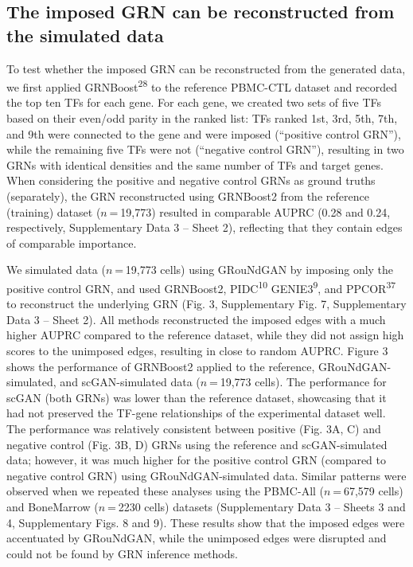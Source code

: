 \subsection*{The imposed GRN can be reconstructed from the simulated data}

To test whether the imposed GRN can be reconstructed from the generated data, we first applied GRNBoost\textsuperscript{28} to the reference PBMC-CTL dataset and recorded the top ten TFs for each gene. For each gene, we created two sets of five TFs based on their even/odd parity in the ranked list: TFs ranked 1st, 3rd, 5th, 7th, and 9th were connected to the gene and were imposed (“positive control GRN”), while the remaining five TFs were not (“negative control GRN”), resulting in two GRNs with identical densities and the same number of TFs and target genes. When considering the positive and negative control GRNs as ground truths (separately), the GRN reconstructed using GRNBoost2 from the reference (training) dataset ($n$ = 19,773) resulted in comparable AUPRC (0.28 and 0.24, respectively, Supplementary Data 3 – Sheet 2), reflecting that they contain edges of comparable importance.

We simulated data ($n$ = 19,773 cells) using GRouNdGAN by imposing only the positive control GRN, and used GRNBoost2, PIDC\textsuperscript{10} GENIE3\textsuperscript{9}, and PPCOR\textsuperscript{37} to reconstruct the underlying GRN (Fig. 3, Supplementary Fig. 7, Supplementary Data 3 – Sheet 2). All methods reconstructed the imposed edges with a much higher AUPRC compared to the reference dataset, while they did not assign high scores to the unimposed edges, resulting in close to random AUPRC. Figure 3 shows the performance of GRNBoost2 applied to the reference, GRouNdGAN-simulated, and scGAN-simulated data ($n$ = 19,773 cells). The performance for scGAN (both GRNs) was lower than the reference dataset, showcasing that it had not preserved the TF-gene relationships of the experimental dataset well. The performance was relatively consistent between positive (Fig. 3A, C) and negative control (Fig. 3B, D) GRNs using the reference and scGAN-simulated data; however, it was much higher for the positive control GRN (compared to negative control GRN) using GRouNdGAN-simulated data. Similar patterns were observed when we repeated these analyses using the PBMC-All ($n$ = 67,579 cells) and BoneMarrow ($n$ = 2230 cells) datasets (Supplementary Data 3 – Sheets 3 and 4, Supplementary Figs. 8 and 9). These results show that the imposed edges were accentuated by GRouNdGAN, while the unimposed edges were disrupted and could not be found by GRN inference methods.



